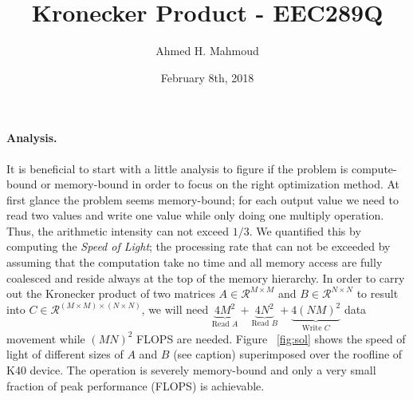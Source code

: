 \documentclass[12pt] {article}
\begin{document}
\title{Kronecker Product -  EEC289Q}
\author{Ahmed H. Mahmoud}
\date{February 8th, 2018}
\maketitle

\paragraph{Analysis.} It is beneficial to start with a little analysis to figure if the problem is compute-bound or memory-bound in order to focus on the right optimization method. At first glance the problem seems memory-bound; for each output value we need to read two values and write one value while only doing one multiply operation. Thus, the arithmetic intensity can not exceed $1/3$. We quantified this by computing the \emph{Speed of Light}; the processing rate that can not be exceeded by assuming that the computation take no time and all memory access are fully coalesced and reside always at the top of the memory hierarchy. In order to carry out the Kronecker product of two matrices $A\in \mathcal{R}^{M\times M}$ and $B\in \mathcal{R}^{N\times N}$ to result into $C\in \mathcal{R}^{\left(M\times M \right)\times \left(N\times N\right)}$, we will need 
$
\underbrace{4M^{2}}_\text{Read $A$} + 
\underbrace{4N^{2}}_\text{Read $B$} +
\underbrace{4(NM)^{2}}_\text{Write $C$}
$
data movement while $(MN)^{2}$ FLOPS are needed. Figure ~\ref{fig:sol} shows the speed of light of different sizes of $A$ and $B$ (see caption) superimposed over the roofline of K40 device. The operation is severely memory-bound and only a very small fraction of peak performance (FLOPS) is achievable.  
\end{document}
